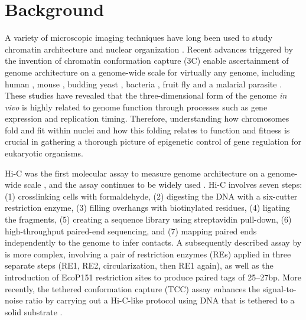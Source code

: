 \begin{abstract}{Abstract}
\textbf{Conclusion:} TM3C is a simple protocol for ascertaining genome
architecture and can be used to identify simultaneous contacts among three
or four loci. Application of TM3C to a near-haploid human cell line
revealed large-scale features of chromosomal organization and multi-way
chromatin contacts that preferentially link regions of open chromatin.

\textbf{Keywords:} genome architecture, chromatin conformation capture,
multi-locus chromatin contacts, near-haploid human cells, leukemia,
three-dimensional modeling.

\end{abstract}

\section{Background}

A variety of microscopic imaging techniques have long been used to study
chromatin architecture and nuclear organization
\citep{langer-safer:immunological, manders:four-dimensional,
cremer:multicolor}. Recent advances triggered by the invention of chromatin
conformation capture (3C) enable ascertainment of genome architecture on a
genome-wide scale for virtually any genome, including human
\citep{lieberman-aiden:comprehensive, dixon:topological, jin:high-resolution},
mouse \citep{zhang:spatial, dixon:topological}, budding yeast
\citep{duan:three}, bacteria \citep{umbarger:three-dimensional}, fruit fly
\citep{sexton:three-dimensional} and a malarial parasite
\citep{ay:three-dimensional}. These studies have revealed that the
three-dimensional form of the genome {\em in vivo} is highly related to genome
function through processes such as gene expression and replication timing.
Therefore, understanding how chromosomes fold and fit within nuclei and how
this folding relates to function and fitness is crucial in gathering a
thorough picture of epigenetic control of gene regulation for eukaryotic
organisms.


Hi-C was the first molecular assay to measure genome architecture on a genome-wide
scale \citep{lieberman-aiden:comprehensive}, and the assay continues to
be widely used \citep{jin:high-resolution, naumova:organization, ay:three-dimensional}.
Hi-C involves seven steps: (1) crosslinking cells with
formaldehyde, (2) digesting the DNA with a six-cutter restriction enzyme, (3)
filling overhangs with biotinylated residues, (4) ligating the fragments, (5)
creating a sequence library using streptavidin pull-down, (6) high-throughput
paired-end sequencing, and (7) mapping paired ends independently to the genome
to infer contacts. A subsequently described assay by \citet{duan:three} is more
complex, involving a pair of restriction enzymes (REs) applied in three separate
steps (RE1, RE2, circularization, then RE1 again), as well as the introduction
of EcoP151 restriction sites to produce paired tags of 25--27bp. More recently,
the tethered conformation capture (TCC) assay enhances the signal-to-noise
ratio by carrying out a Hi-C-like protocol using DNA that is tethered to a
solid substrate \citep{kalhor:genome}.

